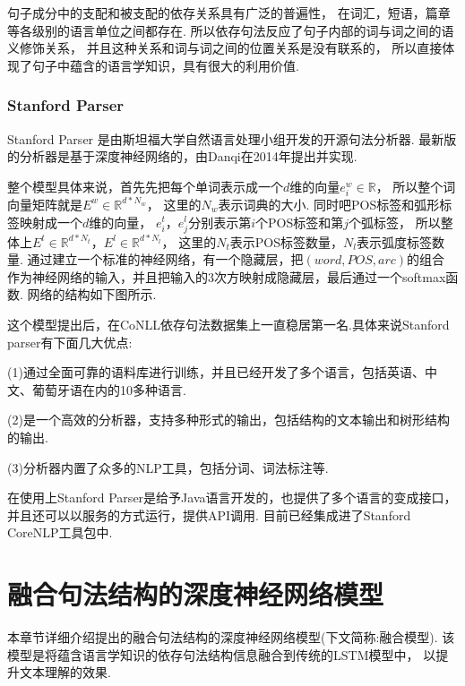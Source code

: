\documentclass[bachelor,adobefonts]{jnuthesis}
\begin{document}
句子成分中的支配和被支配的依存关系具有广泛的普遍性，
在词汇，短语，篇章等各级别的语言单位之间都存在.
所以依存句法反应了句子内部的词与词之间的语义修饰关系，
并且这种关系和词与词之间的位置关系是没有联系的，
所以直接体现了句子中蕴含的语言学知识，具有很大的利用价值.

\subsection{Stanford Parser}
Stanford Parser 是由斯坦福大学自然语言处理小组开发的开源句法分析器.
最新版的分析器是基于深度神经网络的，由Danqi在2014年提出并实现\cite{The}.

整个模型具体来说，首先先把每个单词表示成一个$d$维的向量$e_{i}^{w} \in \mathbb{R}$，
所以整个词向量矩阵就是$E^{w} \in \mathbb{R}^{d*N_{w}}$，
这里的$N_{w}$表示词典的大小.
同时吧POS标签和弧形标签映射成一个$d$维的向量，
$e^{t}_{i}$，$e^{l}_{j}$分别表示第$i$个POS标签和第$j$个弧标签，
所以整体上$E^{t} \in \mathbb{R}^{d*N_{t}}$，$E^{l} \in \mathbb{R}^{d*N_{l}}$，
这里的$N_{t}$表示POS标签数量，$N_{l}$表示弧度标签数量.
通过建立一个标准的神经网络，有一个隐藏层，把$(word,POS,arc)$的组合
作为神经网络的输入，并且把输入的3次方映射成隐藏层，最后通过一个softmax函数.
网络的结构如下图所示.



这个模型提出后，在CoNLL依存句法数据集上一直稳居第一名.具体来说Stanford parser有下面几大优点:

(1)通过全面可靠的语料库进行训练，并且已经开发了多个语言，包括英语、中文、葡萄牙语在内的10多种语言.

(2)是一个高效的分析器，支持多种形式的输出，包括结构的文本输出和树形结构的输出.

(3)分析器内置了众多的NLP工具，包括分词、词法标注等.

在使用上Stanford Parser是给予Java语言开发的，也提供了多个语言的变成接口，
并且还可以以服务的方式运行，提供API调用.
目前已经集成进了Stanford CoreNLP工具包中.



\chapter{融合句法结构的深度神经网络模型}
本章节详细介绍提出的融合句法结构的深度神经网络模型(下文简称:融合模型).
该模型是将蕴含语言学知识的依存句法结构信息融合到传统的LSTM模型中，
以提升文本理解的效果.
\end{document}
